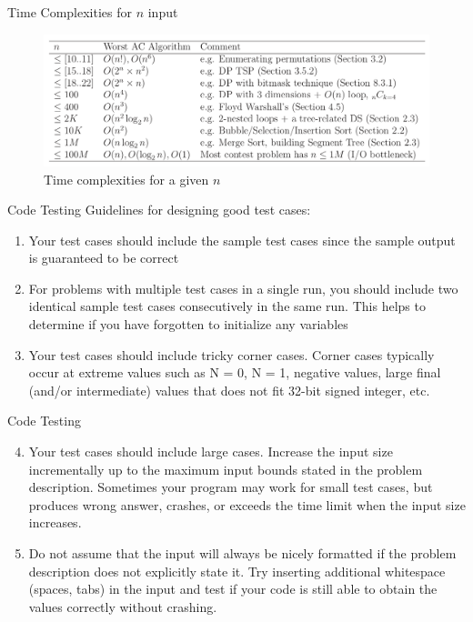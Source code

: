 \documentclass{beamer}
\begin{document}
\begin{frame}{Time Complexities for $n$ input}
    \begin{figure}
        \centering
        \includegraphics[scale=0.25]{imgs/1-CompetitiveProgramming/rule_of_thumb_complexities.png}
        \caption{Time complexities for a given $n$}
        \label{fig:my_label_20}
    \end{figure}
\end{frame}

\begin{frame}{Code Testing}
    Guidelines for designing good test cases:
    \begin{enumerate}
        \item Your test cases should include the sample test cases since the sample output is guaranteed to be correct
        \item For problems with multiple test cases in a single run, you should include two identical sample test cases consecutively in the same run. This helps to determine if you have forgotten to initialize any variables
        \item Your test cases should include tricky corner cases. Corner cases typically occur at extreme values such as N = 0, N = 1, negative values, large final (and/or intermediate) values that does not fit 32-bit signed integer, etc.
    \end{enumerate}
\end{frame}

\begin{frame}{Code Testing}
    \begin{enumerate}
      \setcounter{enumi}{3}
        \item Your test cases should include large cases. Increase the input size incrementally up to the maximum input bounds stated in the problem description. Sometimes your program may work for small test cases, but produces wrong answer, crashes, or exceeds the time limit when the input size increases.
        \item Do not assume that the input will always be nicely formatted if the problem description does not explicitly state it. Try inserting additional whitespace (spaces, tabs) in the input and test if your code is still able to obtain the values correctly without crashing.
    \end{enumerate}
\end{frame}
\end{document}
